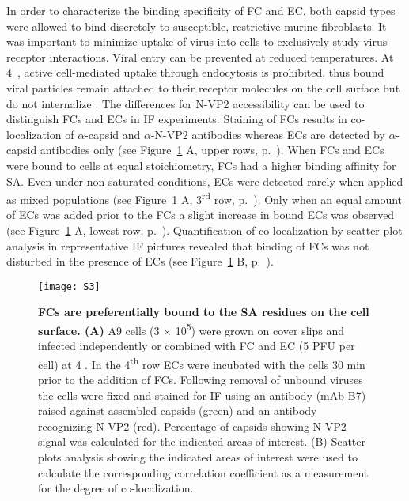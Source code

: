 In order to characterize the binding specificity of FC and EC, both capsid types were allowed to bind discretely to susceptible, restrictive murine fibroblasts. It was important to minimize uptake of virus into cells to exclusively study virus-receptor interactions. Viral entry can be prevented at reduced temperatures. At 4~\textcelsius, active cell-mediated uptake through endocytosis is prohibited, thus bound viral particles remain attached to their receptor molecules on the cell surface but do not internalize \cite{pmid20517}. The differences for N-VP2 accessibility can be used to distinguish FCs and ECs in IF experiments. Staining of FCs results in co-localization of $\alpha$-capsid and $\alpha$-N-VP2 antibodies whereas ECs are detected by $\alpha$-capsid antibodies only (see Figure~\ref{S3} A, upper rows, p.~\pageref{S3}). When FCs and ECs were bound to cells at equal stoichiometry, FCs had a higher binding affinity for SA. Even under non-saturated conditions, ECs were detected rarely when applied as mixed populations (see Figure~\ref{S3} A, 3\textsuperscript{rd} row, p.~\pageref{S3}). Only when an equal amount of ECs was added prior to the FCs a slight increase in bound ECs was observed (see Figure~\ref{S3} A, lowest row, p.~\pageref{S3}). Quantification of co-localization by scatter plot analysis in representative IF pictures revealed that binding of FCs was not disturbed in the presence of ECs (see Figure~\ref{S3} B, p.~\pageref{S3}).             


\begin{figure}
\centering
  \texttt{[image: S3]} \\[0.35 cm]
  \caption[FCs are Preferentially Bound to the SA Residues on the Cell Surface]
   {\textbf{FCs are preferentially bound to the SA residues on the cell surface. (A)} A9 cells (3 $\times$ 10\textsuperscript{5}) were grown on cover slips and infected independently or combined with FC and EC (5 PFU per cell) at 4 \textcelsius. In the 4\textsuperscript{th} row ECs were incubated with the cells 30 min prior to the addition of FCs. Following removal of unbound viruses the cells were fixed and stained for IF using an antibody (mAb B7) raised against assembled capsids (green) and an antibody recognizing N-VP2 (red). Percentage of capsids showing N-VP2 signal was calculated for the indicated areas of interest. (B) Scatter plots analysis showing the indicated areas of interest were used to calculate the corresponding correlation coefficient as a measurement for the degree of co-localization.} 
\label{S3}
\end{figure}



